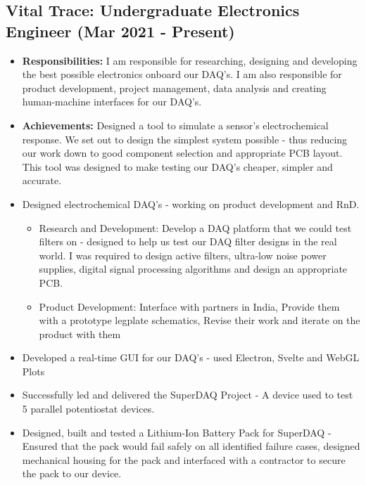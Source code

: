 \documentclass{article}[a4page]
\begin{document}
\subsection*{Vital Trace: Undergraduate Electronics Engineer (Mar 2021 - Present)}
\begin{itemize}
    \item \textbf{Responsibilities: } I am responsible for researching, designing and developing the best possible electronics onboard our DAQ's. I am also responsible for product development, project management, data analysis and creating human-machine interfaces for our DAQ's. 
    \item \textbf{Achievements: } Designed a tool to simulate a sensor's electrochemical response. We set out to design the simplest system possible - thus reducing our work down to good component selection and appropriate PCB layout. This tool was designed to make testing our DAQ's cheaper, simpler and accurate.
        \item Designed electrochemical DAQ's - working on product development and RnD.
        \begin{itemize}
            \item Research and Development: Develop a DAQ platform that we could test filters on - designed to help us test our DAQ filter designs in the real world. I was required to design active filters, ultra-low noise power supplies, digital signal processing algorithms and design an appropriate PCB.
            \item Product Development: Interface with partners in India, Provide them with a prototype legplate schematics, Revise their work and iterate on the product with them
        \end{itemize}
        \item Developed a real-time GUI for our DAQ's - used Electron, Svelte and WebGL Plots
        \item Successfully led and delivered the SuperDAQ Project - A device used to test 5 parallel potentiostat devices.
        \item Designed, built and tested a Lithium-Ion Battery Pack for SuperDAQ - Ensured that the pack would fail safely on all identified failure cases, designed mechanical housing for the pack and interfaced with a contractor to secure the pack to our device.
\end{itemize}
\end{document}
